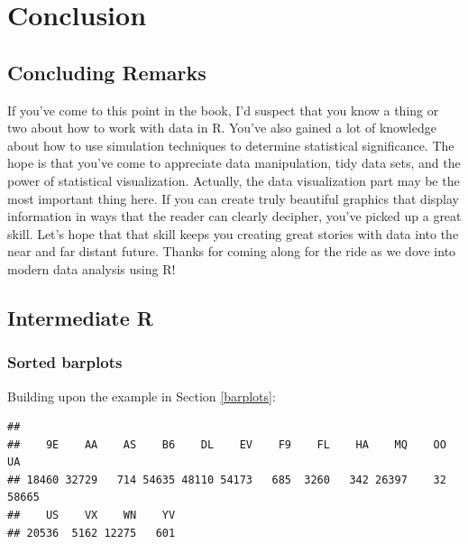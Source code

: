 \documentclass[]{tufte-book}
\newenvironment{Shaded}{\begin{snugshade}}{\end{snugshade}}
\newcommand{\KeywordTok}[1]{\textcolor[rgb]{0.13,0.29,0.53}{\textbf{{#1}}}}
\newcommand{\StringTok}[1]{\textcolor[rgb]{0.31,0.60,0.02}{{#1}}}
\newcommand{\NormalTok}[1]{{#1}}
\begin{document}
\part{Conclusion}\label{part-conclusion}


\chapter{Concluding Remarks}\label{conclusion}

If you've come to this point in the book, I'd suspect that you know a
thing or two about how to work with data in R. You've also gained a lot
of knowledge about how to use simulation techniques to determine
statistical significance. The hope is that you've come to appreciate
data manipulation, tidy data sets, and the power of statistical
visualization. Actually, the data visualization part may be the most
important thing here. If you can create truly beautiful graphics that
display information in ways that the reader can clearly decipher, you've
picked up a great skill. Let's hope that that skill keeps you creating
great stories with data into the near and far distant future. Thanks for
coming along for the ride as we dove into modern data analysis using R!

\appendix


\chapter{Intermediate R}\label{appendix1}

\section{Sorted barplots}\label{sorted-barplots}

Building upon the example in Section \ref{barplots}:

\begin{Shaded}
\end{Shaded}

\begin{verbatim}
## 
##    9E    AA    AS    B6    DL    EV    F9    FL    HA    MQ    OO    UA 
## 18460 32729   714 54635 48110 54173   685  3260   342 26397    32 58665 
##    US    VX    WN    YV 
## 20536  5162 12275   601
\end{verbatim}
\end{document}

